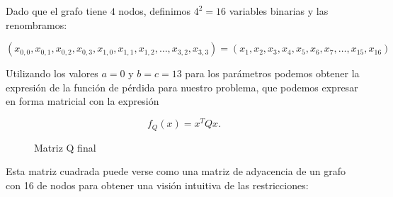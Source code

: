\documentclass[11pt]{article}
\begin{document}
Dado que el grafo tiene $4$ nodos, definimos $4^2 = 16$ variables binarias y las renombramos:

\[ (x_{0,0}, x_{0,1}, x_{0,2}, x_{0,3}, x_{1,0}, x_{1,1}, x_{1,2}, \dots, x_{3,2}, x_{3,3}) =
(x_1, x_2, x_3, x_4, x_5, x_6, x_7, \dots, x_{15}, x_{16}) \]

Utilizando los valores $a = 0$ y $b = c = 13$ para los parámetros podemos obtener la expresión de la función de pérdida para nuestro problema, que podemos expresar en forma matricial con la expresión 

\[ f_Q(x) = x^T Q x. \]

\begin{figure}[H]
	\centering
	\caption{Matriz Q final}
\end{figure}

Esta matriz cuadrada puede verse como una matriz de adyacencia de un grafo con 16 de nodos para obtener una visión intuitiva de las restricciones:
\end{document}
